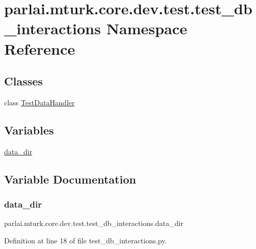 \hypertarget{namespaceparlai_1_1mturk_1_1core_1_1dev_1_1test_1_1test__db__interactions}{}\section{parlai.\+mturk.\+core.\+dev.\+test.\+test\+\_\+db\+\_\+interactions Namespace Reference}
\label{namespaceparlai_1_1mturk_1_1core_1_1dev_1_1test_1_1test__db__interactions}
\subsection*{Classes}
\begin{DoxyCompactItemize}
\item 
class \hyperlink{classparlai_1_1mturk_1_1core_1_1dev_1_1test_1_1test__db__interactions_1_1TestDataHandler}{Test\+Data\+Handler}
\end{DoxyCompactItemize}
\subsection*{Variables}
\begin{DoxyCompactItemize}
\item 
\hyperlink{namespaceparlai_1_1mturk_1_1core_1_1dev_1_1test_1_1test__db__interactions_a1f7ad55ce9f58b4a346558e02060ce66}{data\+\_\+dir}
\end{DoxyCompactItemize}


\subsection{Variable Documentation}
\mbox{\label{namespaceparlai_1_1mturk_1_1core_1_1dev_1_1test_1_1test__db__interactions_a1f7ad55ce9f58b4a346558e02060ce66}} 
\subsubsection{\texorpdfstring{data\+\_\+dir}{data\_dir}}
{\footnotesize\ttfamily parlai.\+mturk.\+core.\+dev.\+test.\+test\+\_\+db\+\_\+interactions.\+data\+\_\+dir}



Definition at line 18 of file test\+\_\+db\+\_\+interactions.\+py.

